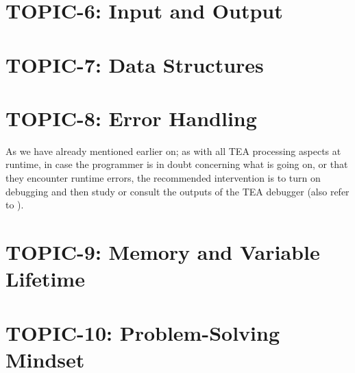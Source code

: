 \documentclass[a4paper, 18pt]{book} %
\begin{document}
{{{\begin{appendices}
\section{TOPIC-6: Input and Output}


\section{TOPIC-7: Data Structures}


\section{TOPIC-8: Error Handling}


As we have already mentioned earlier on; as with all TEA processing aspects at runtime, in case the programmer is in doubt concerning what is going on, or that they encounter runtime errors, the recommended intervention is to turn on debugging and then study or consult the outputs of the TEA debugger (also refer to \cite{Lutalo2025debug}).


\section{TOPIC-9: Memory and Variable Lifetime}


\section{TOPIC-10: Problem-Solving Mindset}






\end{appendices}

%






\vspace{5cm}
\\


}}}
\end{document}
